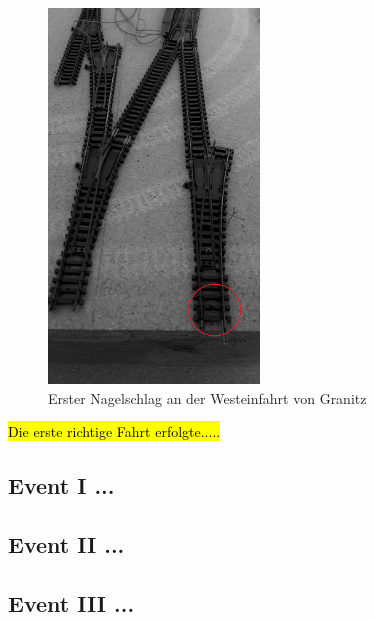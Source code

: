 \begin{figure}[h]
\centering
  \includegraphics[width=0.5\textwidth]{img/events/first_nail_edit.png}
	\caption{Erster Nagelschlag an der Westeinfahrt von Granitz}
	\label{img:events_first_nail}
\end{figure}


\hl{Die erste richtige Fahrt erfolgte.....}



\subsection{Event I ...}

\subsection{Event II ...}

\subsection{Event III ...}